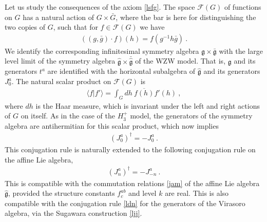 \documentclass[12pt, a4paper, notitlepage, twoside]{report}
\numberwithin{equation}{section}
\theoremstyle{break}
\begin{document}
Let us study the consequences of the axiom \eqref{lsfg}.
The space $\mathcal{F}(G)$ of functions on $G$ has a natural action of 
$G\times \bar{G}$, where the bar is here for distinguishing the two copies of $G$, such that for $f\in \mathcal{F}(G)$ we have 
\begin{align}
\left( (g,\bar{g})\cdot f\right)(h) = f(g^{-1}h\bar{g})\ .
\end{align}
We identify the corresponding infinitesimal symmetry algebra $\mathfrak{g}\times \bar{\mathfrak{g}}$ with the large level limit of the symmetry algebra $\hat{\mathfrak{g}}\times \bar{\hat{\mathfrak{g}}}$ of the WZW model.
That is, $\mathfrak{g}$ and its generators $t^a$ are identified with the horizontal subalgebra of $\hat{\mathfrak{g}}$ and its generators $J^a_0$.
The natural scalar product on $\mathcal{F}(G)$ is 
\begin{align}
 \langle f|f'\rangle = \int_G dh\ \overline{f(h)} f'(h)\ ,
\label{gbg}
\end{align}
where $dh$ is the Haar measure, which is invariant under the left and right actions of $G$ on itself.
As in the case of the $H_3^+$ model, the generators of the symmetry algebra are antihermitian for this scalar product, which now implies
\begin{align}
 (J^a_0)^\dagger = -J^a_0\  . 
\label{jzdj}
\end{align}
This conjugation rule is naturally extended to the following conjugation rule on the affine Lie algebra,
\begin{align}
 \boxed{(J^a_n)^\dagger = -J^a_{-n}}\ .
\end{align}
This is compatible with the commutation relations \eqref{jam} of the affine Lie algebra $\hat{\mathfrak{g}}$, provided the structure constants $f^{ab}_c$ and level $k$ are real.
This is also compatible with the conjugation rule \eqref{ldn} for the generators of the Virasoro algebra, via the Sugawara construction \eqref{ljj}.
\end{document}
